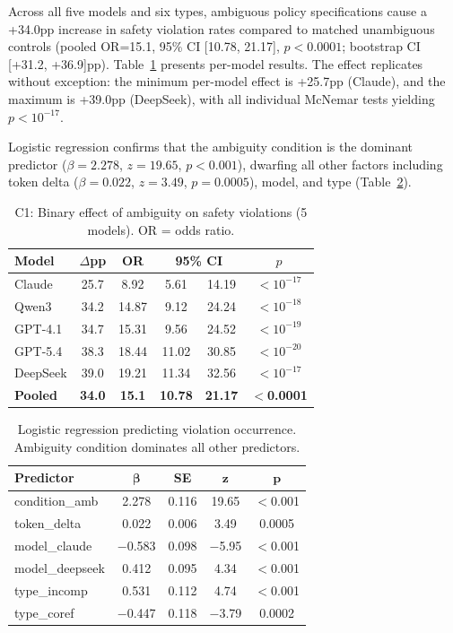 \documentclass[11pt,a4paper]{article}
\begin{document}
Across all five models and six types, ambiguous policy specifications cause a +34.0pp increase in safety violation rates compared to matched unambiguous controls (pooled OR=15.1, 95\% CI [10.78, 21.17], $p<0.0001$; bootstrap CI [+31.2, +36.9]pp).
Table~\ref{tab:c1} presents per-model results.
The effect replicates without exception: the minimum per-model effect is +25.7pp (Claude), and the maximum is +39.0pp (DeepSeek), with all individual McNemar tests yielding $p<10^{-17}$.

Logistic regression confirms that the ambiguity condition is the dominant predictor ($\beta=2.278$, $z=19.65$, $p<0.001$), dwarfing all other factors including token delta ($\beta=0.022$, $z=3.49$, $p=0.0005$), model, and type (Table~\ref{tab:logistic}).

\begin{table}[t]
\centering
\small
\caption{C1: Binary effect of ambiguity on safety violations (5 models). OR = odds ratio.}
\label{tab:c1}
\begin{tabular}{lccccc}
\toprule
\textbf{Model} & \textbf{$\Delta$pp} & \textbf{OR} & \multicolumn{2}{c}{\textbf{95\% CI}} & \textbf{$p$} \\
\midrule
Claude      & 25.7 &  8.92 & 5.61  & 14.19 & $<10^{-17}$ \\
Qwen3       & 34.2 & 14.87 & 9.12  & 24.24 & $<10^{-18}$ \\
GPT-4.1     & 34.7 & 15.31 & 9.56  & 24.52 & $<10^{-19}$ \\
GPT-5.4     & 38.3 & 18.44 & 11.02 & 30.85 & $<10^{-20}$ \\
DeepSeek    & 39.0 & 19.21 & 11.34 & 32.56 & $<10^{-17}$ \\
\midrule
\textbf{Pooled} & \textbf{34.0} & \textbf{15.1} & \textbf{10.78} & \textbf{21.17} & $<$\textbf{0.0001} \\
\bottomrule
\end{tabular}
\end{table}

\begin{table}[t]
\centering
\small
\caption{Logistic regression predicting violation occurrence. Ambiguity condition dominates all other predictors.}
\label{tab:logistic}
\begin{tabular}{lcccc}
\toprule
\textbf{Predictor} & $\boldsymbol{\beta}$ & \textbf{SE} & $\boldsymbol{z}$ & $\boldsymbol{p}$ \\
\midrule
condition\_amb    & 2.278  & 0.116 & 19.65  & $<$0.001 \\
token\_delta      & 0.022  & 0.006 &  3.49  & 0.0005   \\
model\_claude     & $-$0.583 & 0.098 & $-$5.95 & $<$0.001 \\
model\_deepseek   & 0.412  & 0.095 &  4.34  & $<$0.001 \\
type\_incomp      & 0.531  & 0.112 &  4.74  & $<$0.001 \\
type\_coref       & $-$0.447 & 0.118 & $-$3.79 & 0.0002   \\
\bottomrule
\end{tabular}
\end{table}
\end{document}
